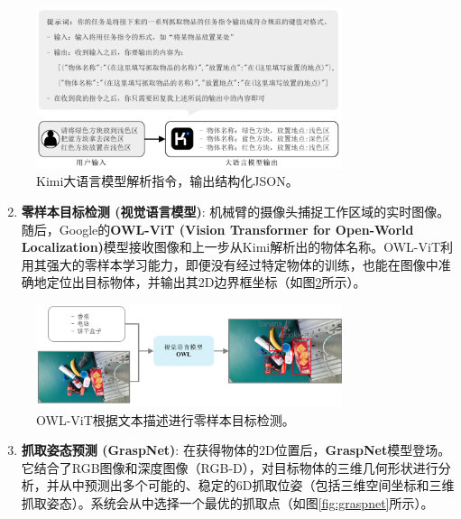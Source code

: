 \documentclass{article}
\begin{document}
\begin{CJK*}{UTF8}{gbsn}
\begin{figure}[h!]
    \centering
    \includegraphics[width=0.8\textwidth]{image/report/fig_kimi_parser.png}
    \caption{Kimi大语言模型解析指令，输出结构化JSON。}
    \label{fig:kimi}
\end{figure}

\begin{enumerate}
    \setcounter{enumi}{1}
    \item  \textbf{零样本目标检测 (视觉语言模型)}: 机械臂的摄像头捕捉工作区域的实时图像。随后，Google的\textbf{OWL-ViT (Vision Transformer for Open-World Localization)}模型接收图像和上一步从Kimi解析出的物体名称。OWL-ViT利用其强大的零样本学习能力，即便没有经过特定物体的训练，也能在图像中准确地定位出目标物体，并输出其2D边界框坐标（如图\ref{fig:owlvit}所示）。
\end{enumerate}

\begin{figure}[h!]
    \centering
    \includegraphics[width=0.8\textwidth]{image/report/fig_owl_vit_detection.png}
    \caption{OWL-ViT根据文本描述进行零样本目标检测。}
    \label{fig:owlvit}
\end{figure}

\begin{enumerate}
    \setcounter{enumi}{2}
    \item  \textbf{抓取姿态预测 (GraspNet)}: 在获得物体的2D位置后，\textbf{GraspNet}模型登场。它结合了RGB图像和深度图像（RGB-D），对目标物体的三维几何形状进行分析，并从中预测出多个可能的、稳定的6D抓取位姿（包括三维空间坐标和三维抓取姿态）。系统会从中选择一个最优的抓取点（如图\ref{fig:graspnet}所示）。
\end{enumerate}


\end{CJK*}
\end{document}
